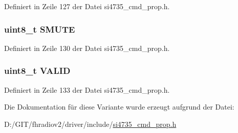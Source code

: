 Definiert in Zeile 127 der Datei si4735\+\_\+cmd\+\_\+prop.\+h.

\hypertarget{unionfm__rsq__status__resp2_a6f4b6956b747e720f4c2eb97e84be9df}{}
\subsubsection[{S\+M\+U\+T\+E}]{\setlength{\rightskip}{0pt plus 5cm}uint8\+\_\+t S\+M\+U\+T\+E}\label{unionfm__rsq__status__resp2_a6f4b6956b747e720f4c2eb97e84be9df}


Definiert in Zeile 130 der Datei si4735\+\_\+cmd\+\_\+prop.\+h.

\hypertarget{unionfm__rsq__status__resp2_a58bd81dc31c117b187f38fbc118b393e}{}
\subsubsection[{V\+A\+L\+I\+D}]{\setlength{\rightskip}{0pt plus 5cm}uint8\+\_\+t V\+A\+L\+I\+D}\label{unionfm__rsq__status__resp2_a58bd81dc31c117b187f38fbc118b393e}


Definiert in Zeile 133 der Datei si4735\+\_\+cmd\+\_\+prop.\+h.



Die Dokumentation für diese Variante wurde erzeugt aufgrund der Datei\+:\begin{DoxyCompactItemize}
\item 
D\+:/\+G\+I\+T/fhradiov2/driver/include/\hyperlink{si4735__cmd__prop_8h}{si4735\+\_\+cmd\+\_\+prop.\+h}\end{DoxyCompactItemize}
